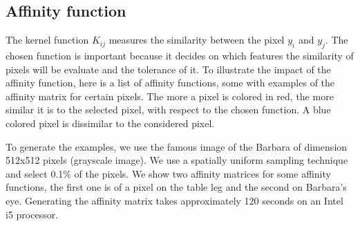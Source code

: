 \subsection{Affinity function}
\label{subsec:kernel-variations}
The kernel function \(K_{ij}\) measures the similarity between the pixel \(y_i\) and \(y_j\).
The chosen function is important because it decides on which features the similarity of pixels will be evaluate and the tolerance of it.
To illustrate the impact of the affinity function, here is a list of affinity functions, some with examples of the affinity matrix for certain pixels.
The more a pixel is colored in red, the more similar it is to the selected pixel, with respect to the chosen function.
A blue colored pixel is dissimilar to the considered pixel.

To generate the examples, we use the famous image of the Barbara of dimension 512x512 pixels (grayscale image).
We use a spatially uniform sampling technique and select 0.1\% of the pixels.
We show two affinity matrices for some affinity functions, the first one is of a pixel on the table leg and the second on Barbara's eye.
Generating the affinity matrix takes approximately 120 seconds on an Intel i5 processor.


